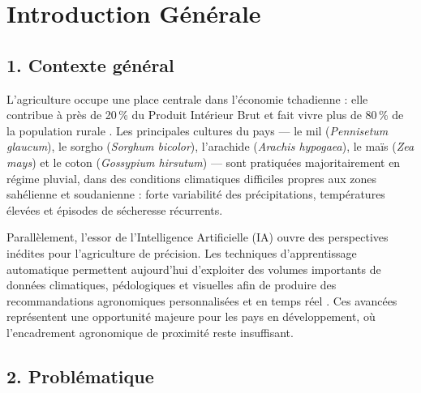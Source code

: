 
\chapter*{Introduction Générale}

\section*{1. Contexte général}

L'agriculture occupe une place centrale dans l'économie tchadienne :
elle contribue à près de 20\,\% du Produit Intérieur Brut et fait
vivre plus de 80\,\% de la population rurale
\cite{banquemondiale2023}. Les principales cultures du pays --- le
mil (\textit{Pennisetum glaucum}), le sorgho (\textit{Sorghum
	bicolor}), l'arachide (\textit{Arachis hypogaea}), le maïs
(\textit{Zea mays}) et le coton (\textit{Gossypium hirsutum}) ---
sont pratiquées majoritairement en régime pluvial, dans des
conditions climatiques difficiles propres aux zones sahélienne et
soudanienne : forte variabilité des précipitations, températures
élevées et épisodes de sécheresse récurrents.

\medskip

Parallèlement, l'essor de l'Intelligence Artificielle (IA) ouvre
des perspectives inédites pour l'agriculture de précision. Les
techniques d'apprentissage automatique permettent aujourd'hui
d'exploiter des volumes importants de données climatiques,
pédologiques et visuelles afin de produire des recommandations
agronomiques personnalisées et en temps réel
\cite{liakos2018machine}. Ces avancées représentent une opportunité
majeure pour les pays en développement, où l'encadrement agronomique
de proximité reste insuffisant.

\section*{2. Problématique}


